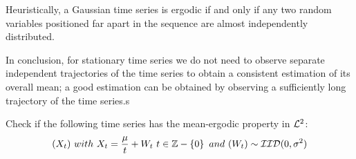 Heuristically, a Gaussian time series is ergodic if and only if any two random variables positioned far apart in the sequence are almost independently distributed. 

In conclusion, for stationary time series we do not need to observe separate independent trajectories of the time series to obtain a consistent estimation of its overall mean; a good estimation can be obtained by observing a sufficiently long trajectory of the time series.s

\begin{exercise}
    Check if the following time series has the mean-ergodic property in $\mathcal{L}^{2}$:
    \[
        (X_t)\ with\ X_t=\frac{\mu}{t}+W_t\ t\in\Z-\set{0}\ and\ (W_t)\sim\mathcal{IID}(0,\sigma^2)
    \] 
\end{exercise}
